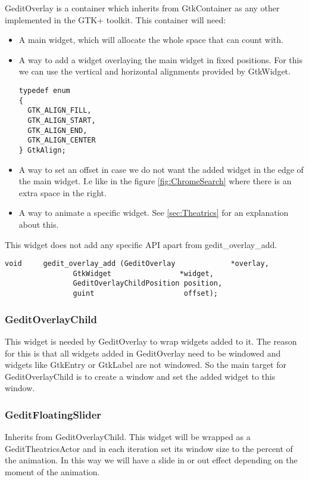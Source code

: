 GeditOverlay is a container which inherits from GtkContainer as any other implemented in the GTK+ toolkit. This container will need:
\begin{itemize}
  \item A main widget, which will allocate the whole space that can count with.
  \item A way to add a widget overlaying the main widget in fixed positions. For this we can use the vertical and horizontal alignments provided by GtkWidget.
\begin{lstlisting}[style=GObject]
typedef enum
{
  GTK_ALIGN_FILL,
  GTK_ALIGN_START,
  GTK_ALIGN_END,
  GTK_ALIGN_CENTER
} GtkAlign;
\end{lstlisting}
  \item A way to set an offset in case we do not want the added widget in the edge of the main widget. I.e like in the figure \ref{fig:ChromeSearch} where there is an extra space in the right.
  \item A way to animate a specific widget. See \ref{sec:Theatrics} for an explanation about this.
\end{itemize}

This widget does not add any specific API apart from gedit\_overlay\_add.

\begin{lstlisting}[style=GObject]
void	 gedit_overlay_add (GeditOverlay             *overlay,
			    GtkWidget                *widget,
			    GeditOverlayChildPosition position,
			    guint                     offset);
\end{lstlisting}

\subsubsection{GeditOverlayChild}

This widget is needed by GeditOverlay to wrap widgets added to it. The reason for this is that all widgets added in GeditOverlay need to be windowed and widgets like GtkEntry or GtkLabel are not windowed. So the main target for GeditOverlayChild is to create a window and set the added widget to this window.

\subsubsection{GeditFloatingSlider}

Inherits from GeditOverlayChild. This widget will be wrapped as a GeditTheatricsActor and in each iteration set its window size to the percent of the animation. In this way we will have a slide in or out effect depending on the moment of the animation.

